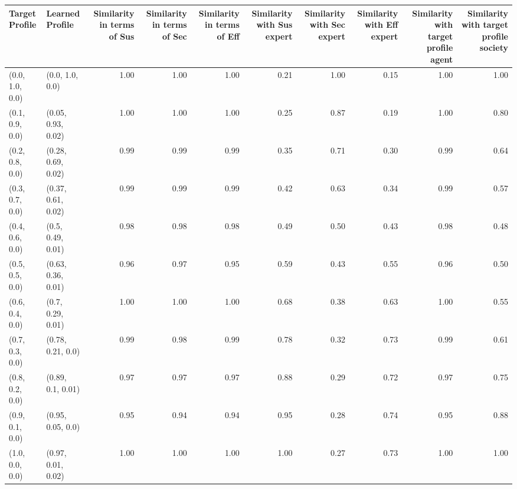 \begin{tabular}{llrrrrrrrr}
\toprule
Target Profile & Learned Profile & Similarity in terms of Sus & Similarity in terms of Sec & Similarity in terms of Eff & Similarity with Sus expert & Similarity with Sec expert & Similarity with Eff expert & Similarity with target profile agent & Similarity with target profile society \\
\midrule
(0.0, 1.0, 0.0) & (0.0, 1.0, 0.0) & 1.00 & 1.00 & 1.00 & 0.21 & 1.00 & 0.15 & 1.00 & 1.00 \\
(0.1, 0.9, 0.0) & (0.05, 0.93, 0.02) & 1.00 & 1.00 & 1.00 & 0.25 & 0.87 & 0.19 & 1.00 & 0.80 \\
(0.2, 0.8, 0.0) & (0.28, 0.69, 0.02) & 0.99 & 0.99 & 0.99 & 0.35 & 0.71 & 0.30 & 0.99 & 0.64 \\
(0.3, 0.7, 0.0) & (0.37, 0.61, 0.02) & 0.99 & 0.99 & 0.99 & 0.42 & 0.63 & 0.34 & 0.99 & 0.57 \\
(0.4, 0.6, 0.0) & (0.5, 0.49, 0.01) & 0.98 & 0.98 & 0.98 & 0.49 & 0.50 & 0.43 & 0.98 & 0.48 \\
(0.5, 0.5, 0.0) & (0.63, 0.36, 0.01) & 0.96 & 0.97 & 0.95 & 0.59 & 0.43 & 0.55 & 0.96 & 0.50 \\
(0.6, 0.4, 0.0) & (0.7, 0.29, 0.01) & 1.00 & 1.00 & 1.00 & 0.68 & 0.38 & 0.63 & 1.00 & 0.55 \\
(0.7, 0.3, 0.0) & (0.78, 0.21, 0.0) & 0.99 & 0.98 & 0.99 & 0.78 & 0.32 & 0.73 & 0.99 & 0.61 \\
(0.8, 0.2, 0.0) & (0.89, 0.1, 0.01) & 0.97 & 0.97 & 0.97 & 0.88 & 0.29 & 0.72 & 0.97 & 0.75 \\
(0.9, 0.1, 0.0) & (0.95, 0.05, 0.0) & 0.95 & 0.94 & 0.94 & 0.95 & 0.28 & 0.74 & 0.95 & 0.88 \\
(1.0, 0.0, 0.0) & (0.97, 0.01, 0.02) & 1.00 & 1.00 & 1.00 & 1.00 & 0.27 & 0.73 & 1.00 & 1.00 \\
\bottomrule
\end{tabular}

